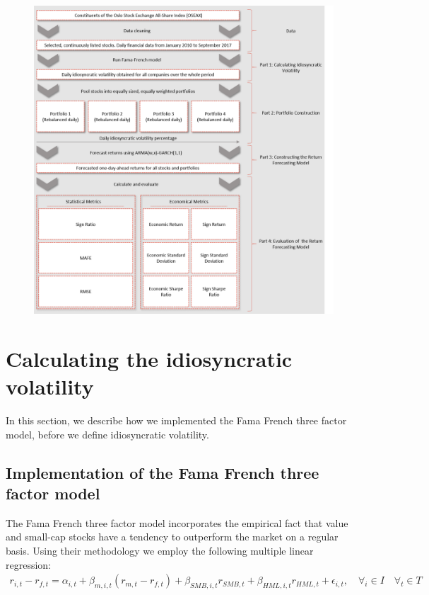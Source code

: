 \begin{figure}
    \centering
    \includegraphics[scale=0.5]{Pictures/FlowChart.png}
    \label{FlowChart}
\end{figure}

\newpage
\section{Calculating the idiosyncratic volatility}

In this section, we describe how we implemented the Fama French three factor model, before we define idiosyncratic volatility.

\subsection{Implementation of the Fama French three factor model} The Fama French three factor model \cite{famafrench} incorporates the empirical fact that value and small-cap stocks have a tendency to outperform the market on a regular basis. Using their methodology we employ the following multiple linear regression:
\begin{align} 
    r_{i,t} - r_{f,t}= \alpha_{i,t} + \beta_{m,i,t}(r_{m,t} - r_{f,t}) + \beta_{SMB,i,t}r_{SMB,t} + \beta_{HML,i,t}r_{HML,t} + \epsilon_{i,t}, \quad  \forall_i \in I \quad  \forall_t \in T 
    \label{FFregression}
\end{align}

